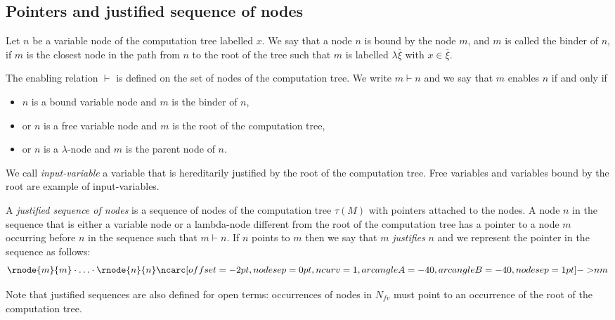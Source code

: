 \subsection{Pointers and justified sequence of nodes}

\begin{dfn}[Binder]
Let $n$ be a variable node of the computation tree labelled $x$. We
say that a node $n$ is bound by the node $m$, and $m$ is called the
binder of $n$, if $m$ is the closest node in the path from $n$ to
the root of the tree such that $m$ is labelled $\lambda
\overline{\xi}$ with $x\in \overline{\xi}$.
\end{dfn}

\begin{dfn}[Enabling]
The enabling relation $\vdash$ is defined on the set of nodes of the
computation tree. We write $m \vdash n$ and we say that $m$ enables
$n$ if and only if
\begin{itemize}
\item $n$ is a bound variable node and $m$ is the binder of $n$,
\item or $n$ is a free variable node and $m$ is the root of the computation tree,
\item or $n$ is a $\lambda$-node and $m$ is the parent node of $n$.
\end{itemize}
\end{dfn}

We call \emph{input-variable} a variable that is hereditarily justified by the root of the computation tree.
Free variables and variables bound by the root are example of input-variables.

\begin{dfn}
A \emph{justified sequence of nodes} is a sequence of
nodes of the computation tree $\tau(M)$ with pointers attached to the nodes. A node $n$ in the sequence
that is either a variable node or a lambda-node different from the root of the computation tree
has a pointer to a node $m$ occurring before $n$ in the sequence such that $m \vdash n$.
If $n$ points to $m$ then we say that $m$ \emph{justifies} $n$ and we represent the pointer in the sequence as follows:
$$\rnode{m}{m} \cdot \ldots \cdot \rnode{n}{n} \bkptr[nodesep=1pt]{40}{n}{m}$$
\end{dfn}
Note that justified sequences are also defined for open terms:
occurrences of nodes in $N_{fv}$ must point to an occurrence of the
root of the computation tree.


